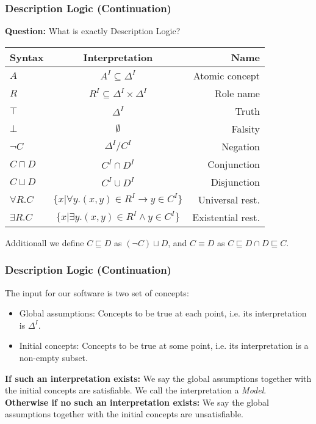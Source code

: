 \begin{frame}
\frametitle{Description Logic (Continuation)}
{\bf Question:} What is exactly Description Logic? \\
\pause
\bigskip
\begin{tabular}{|l|c|r|}
\hline
{\bf Syntax } & {\bf Interpretation } & {\bf Name } \\ \hline
$A$ & $A^{I} \subseteq \Delta^{I}$ & Atomic concept \\ 
$R$ & $R^{I} \subseteq \Delta^{I} \times \Delta^{I}$ & Role name \\
$\top$ & $\Delta^{I}$ & Truth \\
$\bot$ & $\emptyset$ & Falsity \\
$\neg C$ & $\Delta^{I} / C^{I}$ & Negation \\
$C \sqcap D$ & $C^{I} \cap D^{I}$ & Conjunction \\
$C \sqcup D$ & $C^{I} \cup D^{I}$ & Disjunction \\
$\forall R . C$ & $\{x | \forall y . (x,y) \in R^{I} \to y \in C^{I}\}$ & Universal rest. \\
$\exists R . C$ & $\{x | \exists y . (x,y) \in R^{I} \land y \in C^{I}\}$ & Existential rest. \\
\hline 
\end{tabular}
\smallskip
\pause
Additionall we define $C \sqsubseteq D$ as $(\neg C) \sqcup D$, and $C \equiv D$ as $C \sqsubseteq D \cap D \sqsubseteq C$.
\end{frame}

\begin{frame}
\frametitle{Description Logic (Continuation)}
The input for our software is two set of concepts:
\begin{itemize}
\item Global assumptions: Concepts to be true at each point, i.e. its interpretation is $\Delta^{I}$.
\item Initial concepts: Concepts to be true at some point, i.e. its interpretation is a non-empty subset.
\end{itemize}
\bigskip
{\bf If such an interpretation exists:} We say the global assumptions together with the initial concepts are
satisfiable. We call the interpretation a {\it Model}. \\
\smallskip
\pause
{\bf Otherwise if no such an interpretation exists:} We say the global assumptions together with the initial concepts are unsatisfiable.
\end{frame}
